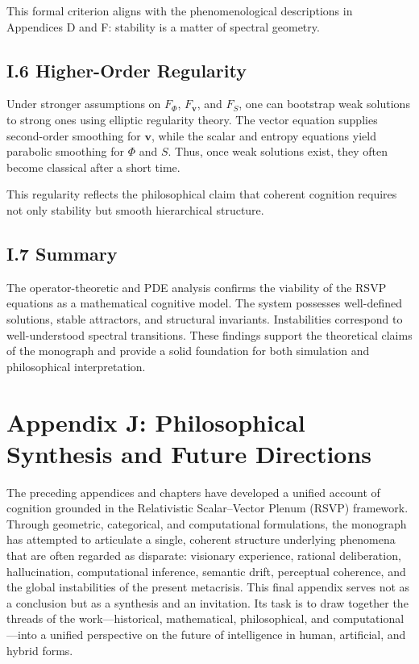 \documentclass[12pt]{article}
\begin{document}
This formal criterion aligns with the phenomenological descriptions in 
Appendices D and F: stability is a matter of spectral geometry.

\subsection*{I.6 Higher-Order Regularity}

Under stronger assumptions on $F_\Phi$, $F_{\mathbf{v}}$, and $F_S$, one can 
bootstrap weak solutions to strong ones using elliptic regularity theory.  
The vector equation supplies second-order smoothing for $\mathbf{v}$, while 
the scalar and entropy equations yield parabolic smoothing for $\Phi$ and $S$.  
Thus, once weak solutions exist, they often become classical after a short 
time.

This regularity reflects the philosophical claim that coherent cognition 
requires not only stability but smooth hierarchical structure.

\subsection*{I.7 Summary}

The operator-theoretic and PDE analysis confirms the viability of the RSVP 
equations as a mathematical cognitive model.  
The system possesses well-defined solutions, stable attractors, and 
structural invariants.  
Instabilities correspond to well-understood spectral transitions.  
These findings support the theoretical claims of the monograph and provide a 
solid foundation for both simulation and philosophical interpretation.

\newpage
\section*{Appendix J: Philosophical Synthesis and Future Directions}

The preceding appendices and chapters have developed a unified account of 
cognition grounded in the Relativistic Scalar--Vector Plenum (RSVP) framework.  
Through geometric, categorical, and computational formulations, the monograph 
has attempted to articulate a single, coherent structure underlying phenomena 
that are often regarded as disparate: visionary experience, rational 
deliberation, hallucination, computational inference, semantic drift, 
perceptual coherence, and the global instabilities of the present 
metacrisis.  
This final appendix serves not as a conclusion but as a synthesis and an 
invitation. Its task is to draw together the threads of the work—historical, 
mathematical, philosophical, and computational—into a unified perspective on 
the future of intelligence in human, artificial, and hybrid forms.
\end{document}

